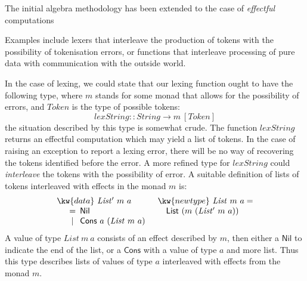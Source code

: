 

\newpage


The initial algebra methodology has been extended to the case of
\emph{effectful} computations 

Examples include lexers that interleave
the production of tokens with the possibility of tokenisation errors,
or functions that interleave processing of pure data with
communication with the outside world.

In the case of lexing, we could state that our lexing function ought
to have the following type, where $m$ stands for some monad that
allows for the possibility of errors, and $\mathit{Token}$ is the type
of possible tokens:
\begin{displaymath}
  \mathit{lexString} :: \mathit{String} \to m~[\mathit{Token}]
\end{displaymath}
the situation described by this
type is somewhat crude. The function $\mathit{lexString}$ returns an
effectful computation which may yield a list of tokens. In the case of
raising an exception to report a lexing error, there will be no way of
recovering the tokens identified before the error. A more refined type
for $\mathit{lexString}$ could \emph{interleave} the tokens with the
possibility of error. A suitable definition of lists of tokens
interleaved with effects in the monad $m$ is:
\begin{displaymath}
  \begin{array}{ll}
    \kw{data}~\mathit{List'}~m~a
    &
    \kw{newtype}~\mathit{List}~m~a = 
    \\
    \quad
    \begin{array}[t]{c@{\hspace{0.5em}}l}
      = & \mathsf{Nil} \\
      | & \mathsf{Cons}~a~(\mathit{List}~m~a) \\
    \end{array}
    &
    \quad \mathsf{List}~(m~(\mathit{List'}~m~a))
  \end{array}
\end{displaymath}
A value of type $\mathit{List}~m~a$ consists of an effect described by
$m$, then either a $\mathsf{Nil}$ to indicate the end of the list, or
a $\mathsf{Cons}$ with a value of type $a$ and more list. Thus this
type describes lists of values of type $a$ interleaved with effects
from the monad $m$.

